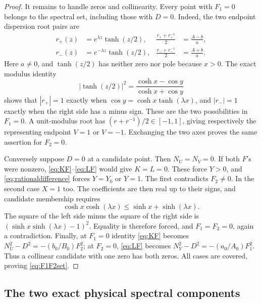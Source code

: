 \documentclass[11pt]{article}
\numberwithin{equation}{section}
\theoremstyle{definition}
\begin{document}
\begin{proof}
It remains to handle zeros and collinearity. Every point with \(F_1=0\)
belongs to the spectral set, including those with \(D=0\). Indeed, the
two endpoint dispersion root pairs are
\begin{align}
 r_+(z)&=e^{\lambda z}\tanh(z/2),&
 \frac{r_++r_+^{-1}}2&=\frac{A-b}{a},\label{eq:endpointplus}\\
 r_-(z)&=e^{-\lambda z}\tanh(z/2),&
 \frac{r_-+r_-^{-1}}2&=\frac{A+b}{a}.\label{eq:endpointminus}
\end{align}
Here \(a\ne0\), and \(\tanh(z/2)\) has neither zero nor pole because
\(x>0\). The exact modulus identity
\[
 |\tanh(z/2)|^2=\frac{\cosh x-\cos y}{\cosh x+\cos y}
\]
shows that \(|r_+|=1\) exactly when
\(\cos y=\cosh x\tanh(\lambda x)\), and \(|r_-|=1\) exactly when
the right side has a minus sign. These are the two possibilities in
\(F_1=0\). A unit-modulus root has \((r+r^{-1})/2\in[-1,1]\),
giving respectively the representing endpoint \(V=1\) or \(V=-1\).
Exchanging the two axes proves the same assertion for \(F_2=0\).

Conversely suppose \(D=0\) at a candidate point. Then \(N_U=N_V=0\).
If both \(F\)'s were nonzero, \eqref{eq:KF}--\eqref{eq:LF} would give
\(K=L=0\). These force \(Y>0\), and
\eqref{eq:rationaldifference} forces \(Y=Y_0\) or \(Y=1\).
The first contradicts \(F_2\ne0\). In the second case \(X=1\) too.
The coefficients are then real up to their signs, and candidate
membership requires
\[
 \cosh x\cosh(\lambda x)\le\sinh x+\sinh(\lambda x).
\]
The square of the left side minus the square of the right side is
\((\sinh x\sinh(\lambda x)-1)^2\). Equality is therefore forced,
and \(F_1=F_2=0\), again a contradiction. Finally, at \(F_1=0\)
identity \eqref{eq:KF} becomes
\(N_U^2-D^2=-(b_0/B_0)F_2^2\); at \(F_2=0\),
\eqref{eq:LF} becomes \(N_V^2-D^2=-(a_0/A_0)F_1^2\).
Thus a collinear candidate with one zero has both zeros. All cases are
covered, proving \eqref{eq:F1F2set}.
\end{proof}

\subsection{The two exact physical spectral components}
\end{document}
